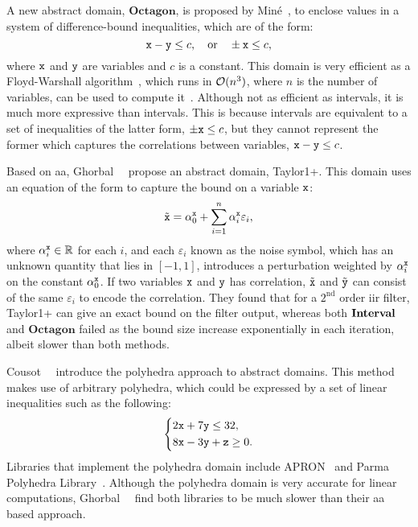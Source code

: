 A new abstract domain, $\mathbf{Octagon}$, is proposed by Min\'e~\cite{mine07},
to enclose values in a system of difference-bound inequalities, which are of
the form:
\begin{equation}
    \texttt{x} - \texttt{y} \leq c, \quad \text{or} \quad
    \pm \texttt{x} \leq c,
\end{equation}
where $\texttt{x}$ and $\texttt{y}$ are variables and $c$ is a constant.  This domain
is very efficient as a Floyd-Warshall algorithm~\cite{floyd62}, which runs in
$\operatorname{\mathcal{O}}(n^3)$, where $n$ is the number of variables, can be used to compute
it~\cite{mine04}.  Although not as efficient as intervals, it is much more
expressive than intervals.  This is because intervals are equivalent to a
set of inequalities of the latter form, $\pm \texttt{x} \leq c$, but they cannot
represent the former which captures the correlations between variables, $\texttt{x}
- \texttt{y} \leq c$.

Based on \gls{aa}, Ghorbal~\etal~\cite{ghorbal09} propose an abstract domain,
Taylor1+\@.  This domain uses an equation of the form to capture the bound on a
variable $\texttt{x}$:
\begin{equation}
    \tilde{\texttt{x}} =
        \alpha^{\texttt{x}}_0 + \sum_{i = 1}^{n} \alpha^{\texttt{x}}_i \varepsilon_i,
\end{equation}
where $\alpha^{\texttt{x}}_i \in \mathbb{R}$ for each $i$, and each $\varepsilon_i$
known as the noise symbol, which has an unknown quantity that lies in $[-1,
1]$, introduces a perturbation weighted by $\alpha^{\texttt{x}}_i$ on the constant
$\alpha^{\texttt{x}}_0$.  If two variables $\texttt{x}$ and $\texttt{y}$ has correlation,
$\tilde{\texttt{x}}$ and $\tilde{\texttt{y}}$ can consist of the same $\varepsilon_i$ to
encode the correlation.  They found that for a $2^\mathrm{nd}$ order \gls{iir}
filter, Taylor1+ can give an exact bound on the filter output, whereas both
$\mathbf{Interval}$ and $\mathbf{Octagon}$ failed as the bound size increase
exponentially in each iteration, albeit slower than both methods.

Cousot~\etal~\cite{cousot78} introduce the polyhedra approach to abstract
domains.  This method makes use of arbitrary polyhedra, which could be
expressed by a set of linear inequalities such as the following:
\begin{equation}
    \left\{
    \begin{aligned}
        & 2\texttt{x} + 7\texttt{y} \leq 32, \\
        & 8\texttt{x} - 3\texttt{y} + \texttt{z} \geq 0.
    \end{aligned}
    \right.
\end{equation}
Libraries that implement the polyhedra domain include APRON~\cite{apron} and
Parma Polyhedra Library~\cite{ppl}.  Although the polyhedra domain is very
accurate for linear computations, Ghorbal~\etal~\cite{ghorbal09} find both
libraries to be much slower than their \gls{aa} based approach.

